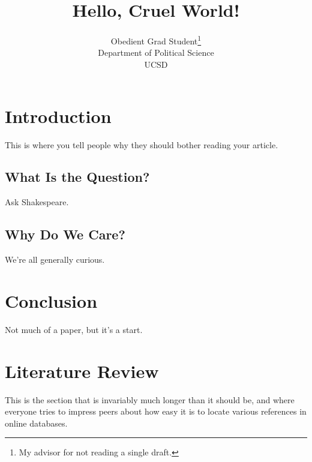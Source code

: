 \documentclass[12pt]{article}
\title{Hello, Cruel World!}
\author{Obedient Grad Student\thanks{My advisor for not reading a single draft.}
\\Department of Political Science
\\UCSD}
\begin{document}
\maketitle

\section{Introduction}
This is where you tell people why they should bother reading your article.

\subsection{What Is the Question?}
Ask Shakespeare.

\subsection{Why Do We Care?}
We're all generally curious.

\section{Conclusion}
Not much of a paper, but it's a start.

\section{Literature Review}
This is the section that is invariably much longer than it should be, and
where everyone tries to impress peers about how easy it is to locate various
references in online databases.
\end{document}
